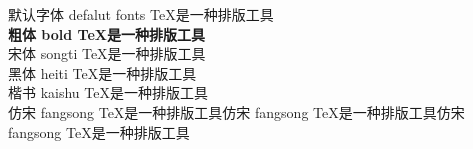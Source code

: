 \documentclass[UTF8,adobefonts]{ctexart}
\begin{document}
默认字体 defalut fonts \TeX 是一种排版工具 \\
{\bfseries 粗体 bold  \TeX 是一种排版工具} \\
{\songti 宋体 songti  \TeX 是一种排版工具} \\
{\heiti 黑体 heiti  \TeX 是一种排版工具} \\
{\kaishu 楷书 kaishu  \TeX 是一种排版工具} \\
{\fangsong 仿宋 fangsong  \TeX 是一种排版工具}{\fangsong 仿宋 fangsong  \TeX 是一种排版工具}{\fangsong 仿宋 fangsong  \TeX 是一种排版工具}
\end{document}
